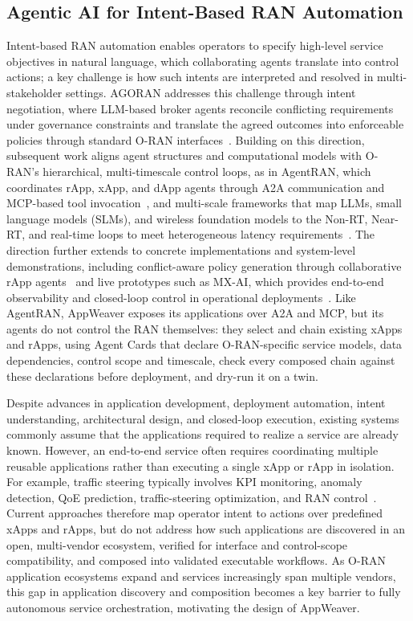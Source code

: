 \documentclass[conference]{IEEEtran}
\begin{document}
\subsection{Agentic AI for Intent-Based RAN Automation}
Intent-based RAN automation enables operators to specify high-level service objectives in natural language, which collaborating agents translate into control actions; a key challenge is how such intents are interpreted and resolved in multi-stakeholder settings. AGORAN addresses this challenge through intent negotiation, where LLM-based broker agents reconcile conflicting requirements under governance constraints and translate the agreed outcomes into enforceable policies through standard O-RAN interfaces~\cite{chatzistefanidis2025agoran}.
Building on this direction, subsequent work aligns agent structures and computational models with O-RAN's hierarchical, multi-timescale control loops, as in AgentRAN, which coordinates rApp, xApp, and dApp agents through A2A communication and MCP-based tool invocation~\cite{elkael2026agentran}, and multi-scale frameworks that map LLMs, small language models (SLMs), and wireless foundation models to the Non-RT, Near-RT, and real-time loops to meet heterogeneous latency requirements~\cite{navidan2026toward}. The direction further extends to concrete implementations and system-level demonstrations, including conflict-aware policy generation through collaborative rApp agents~\cite{li2026multi,chatzimiltis2026agentic} and live prototypes such as MX-AI, which provides end-to-end observability and closed-loop control in operational deployments~\cite{chatzistefanidis2025mxai}. Like AgentRAN, AppWeaver exposes its applications over A2A and MCP, but its agents do not control the RAN themselves: they select and chain existing xApps and rApps, using Agent Cards that declare O-RAN-specific service models, data dependencies, control scope and timescale, check every composed chain against these declarations before deployment, and dry-run it on a twin.

Despite advances in application development, deployment automation, intent understanding, architectural design, and closed-loop execution, existing systems commonly assume that the applications required to realize a service are already known. However, an end-to-end service often requires coordinating multiple reusable applications rather than executing a single xApp or rApp in isolation. For example, traffic steering typically involves KPI monitoring, anomaly detection, QoE prediction, traffic-steering optimization, and RAN control~\cite{yang2024agile}. Current approaches therefore map operator intent to actions over predefined xApps and rApps, but do not address how such applications are discovered in an open, multi-vendor ecosystem, verified for interface and control-scope compatibility, and composed into validated executable workflows. As O-RAN application ecosystems expand and services increasingly span multiple vendors, this gap in application discovery and composition becomes a key barrier to fully autonomous service orchestration, motivating the design of AppWeaver.
\end{document}
